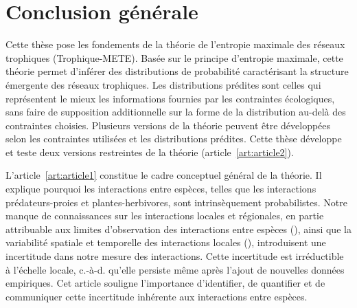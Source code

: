 
\francais   
 
\chapter{Conclusion générale}

Cette thèse pose les fondements de la théorie de l'entropie maximale des réseaux
trophiques (Trophique-METE). Basée sur le principe d'entropie maximale, cette
théorie permet d'inférer des distributions de probabilité caractérisant la
structure émergente des réseaux trophiques. Les distributions prédites sont
celles qui représentent le mieux les informations fournies par les contraintes
écologiques, sans faire de supposition additionnelle sur la forme de la
distribution au-delà des contraintes choisies. Plusieurs versions de la théorie
peuvent être développées selon les contraintes utilisées et les distributions
prédites. Cette thèse développe et teste deux versions restreintes de la théorie
(article~\ref{art:article2}). 

L'article~\ref{art:article1} constitue le cadre conceptuel général de la
théorie. Il explique pourquoi les interactions entre espèces, telles que les
interactions prédateurs-proies et plantes-herbivores, sont intrinsèquement
probabilistes. Notre manque de connaissances sur les interactions locales et
régionales, en partie attribuable aux limites d'observation des interactions
entre espèces (\cite{Jordano2016Sampling}), ainsi que la variabilité spatiale et
temporelle des interactions locales (\cite{Poisot2015Species}), introduisent une
incertitude dans notre mesure des interactions. Cette incertitude est
irréductible à l'échelle locale, c.-à-d. qu'elle persiste même après l'ajout de
nouvelles données empiriques. Cet article souligne l'importance d'identifier, de
quantifier et de communiquer cette incertitude inhérente aux interactions entre
espèces. 

